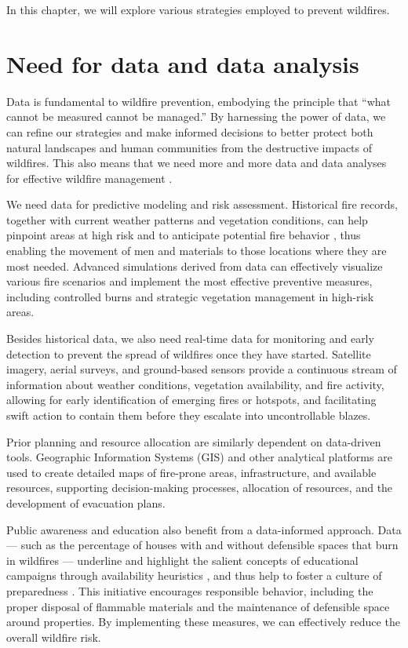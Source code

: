\documentclass[
  12 pt,
]{Nemilov}
\begin{document}
In this chapter, we will explore various strategies employed to prevent wildfires.

\section{Need for data and data analysis}\label{need-for-data-and-data-analysis}

Data is fundamental to wildfire prevention, embodying the principle that ``what cannot be measured cannot be managed.'' By harnessing the power of data, we can refine our strategies and make informed decisions to better protect both natural landscapes and human communities from the destructive impacts of wildfires. This also means that we need more and more data and data analyses for effective wildfire management \citep{bowman2018wildfire}.

We need data for predictive modeling and risk assessment. Historical fire records, together with current weather patterns and vegetation conditions, can help pinpoint areas at high risk and to anticipate potential fire behavior \citep{ankur2018generation}, thus enabling the movement of men and materials to those locations where they are most needed. Advanced simulations derived from data can effectively visualize various fire scenarios and implement the most effective preventive measures, including controlled burns and strategic vegetation management in high-risk areas.

Besides historical data, we also need real-time data for monitoring and early detection to prevent the spread of wildfires once they have started. Satellite imagery, aerial surveys, and ground-based sensors provide a continuous stream of information about weather conditions, vegetation availability, and fire activity, allowing for early identification of emerging fires or hotspots, and facilitating swift action to contain them before they escalate into uncontrollable blazes.

Prior planning and resource allocation are similarly dependent on data-driven tools. Geographic Information Systems (GIS) and other analytical platforms are used to create detailed maps of fire-prone areas, infrastructure, and available resources, supporting decision-making processes, allocation of resources, and the development of evacuation plans.

Public awareness and education also benefit from a data-informed approach. Data --- such as the percentage of houses with and without defensible spaces that burn in wildfires --- underline and highlight the salient concepts of educational campaigns through availability heuristics \citep{keller1997vividness}, and thus help to foster a culture of preparedness \citep{jakes12003model, sturtevant2006encouraging}. This initiative encourages responsible behavior, including the proper disposal of flammable materials and the maintenance of defensible space around properties. By implementing these measures, we can effectively reduce the overall wildfire risk.
\end{document}
